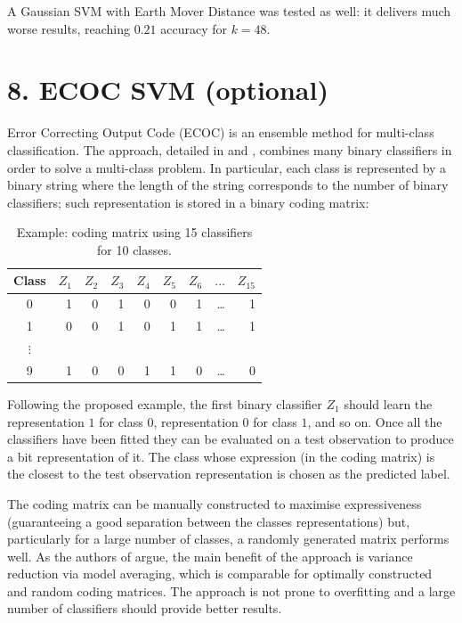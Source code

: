 \documentclass[12pt]{article}
\begin{document}
  A Gaussian SVM with Earth Mover Distance was tested as well: it delivers much worse results, reaching \( 0.21 \) accuracy for \( k = 48 \).


  
  \section*{8. ECOC SVM (optional)}

  Error Correcting Output Code (ECOC) is an ensemble method for multi-class classification. The approach, detailed in \cite{dietterich1994solving} and \cite{james1998error}, combines many binary classifiers in order to solve a multi-class problem. In particular, each class is represented by a binary string where the length of the string corresponds to the number of binary classifiers; such representation is stored in a binary coding matrix:

	\begin{table}[H] 
		\centering
		\caption*{Example: coding matrix using 15 classifiers for 10 classes.}
		\begin{tabular}{crrrrrrrr}
			\toprule
      Class & \( Z_1 \) & \( Z_2 \) & \( Z_3 \) & \( Z_4 \) & \( Z_5 \) & \( Z_6 \) & \( \dots \) & \( Z_{15} \) \\
      \midrule
      0 & 1 & 0 & 1 & 0 & 0 & 1 & \dots & 1 \\
      1 & 0 & 0 & 1 & 0 & 1 & 1 & \dots & 1 \\
      \( \vdots \) & & & & &  & & & \\
      9 & 1 & 0 & 0 & 1 & 1 & 0 &\dots & 0 \\
			\bottomrule
		\end{tabular}
	\end{table}

  Following the proposed example, the first binary classifier \( Z_1 \) should learn the representation \( 1 \) for class \( 0 \), representation \( 0 \) for class \( 1 \), and so on. Once all the classifiers have been fitted they can be evaluated on a test observation to produce a bit representation of it. The class whose expression (in the coding matrix) is the closest to the test observation representation is chosen as the predicted label.

  The coding matrix can be manually constructed to maximise expressiveness (guaranteeing a good separation between the classes representations) but, particularly for a large number of classes, a randomly generated matrix performs well. As the authors of \cite{james1998error} argue, the main benefit of the approach is variance reduction via model averaging, which is comparable for optimally constructed and random coding matrices. The approach is not prone to overfitting and a large number of classifiers should provide better results.
\end{document}
